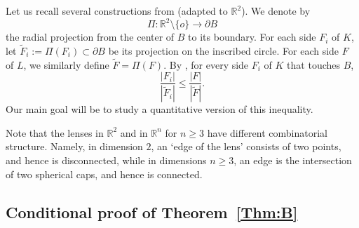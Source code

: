 \documentclass[11pt, oneside]{amsart}
\newcommand{\R}{\mathbb{R}}
\renewcommand{\tilde}{\widetilde}
\newcommand{\sm}{\setminus}
\renewcommand{\ge}{\geqslant}
\renewcommand{\le}{\leqslant}
\theoremstyle{theorem}
\theoremstyle{Intro}
\theoremstyle{definition}
\theoremstyle{remark}
\theoremstyle{claim}
\numberwithin{equation}{section}
\begin{document}
Let us recall several constructions from \cite[Section 4]{DrTa} (adapted to $\R^2$). We denote by  
\[
\Pi \colon \R^2 \sm \{o\} \to \partial B 
\]
the radial projection from the center of $B$ to its boundary. For each side $F_i$ of $K$, let $\tilde F_i := \Pi(F_i) \subset \partial B$ be its projection on the inscribed circle. For each side $F$ of $L$, we similarly define $\tilde F = \Pi(F)$. By \cite[Claim 4.3]{DrTa}, for every side $F_i$ of $K$ that touches $B$,
\begin{equation}
\label{Eq:KeyClaim}
\frac{|F_i|}{|\tilde F_i|} \le \frac{|F|}{|\tilde F|}.
\end{equation}
Our main goal will be to study a quantitative version of this inequality.

Note that the lenses in $\R^2$ and in $\R^n$ for $n \ge 3$ have different combinatorial structure. Namely, in dimension $2$, an `edge of the lens' consists of two points, and hence is disconnected, while in dimensions $n \ge 3$, an edge is the intersection of two spherical caps, and hence is connected. 


\subsection{Conditional proof of Theorem~\ref{Thm:B}} 
\label{SSec:UnderAss}
\end{document}
